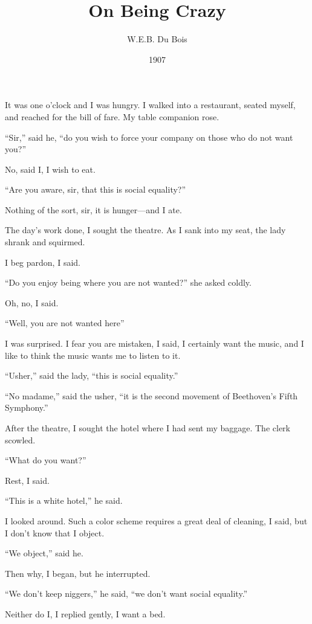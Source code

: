 \documentclass[10pt,a4paper]{article}
\begin{document}
\title{On Being Crazy}
\date{1907}
\author{W.E.B. Du Bois}



\maketitle
\noindent\linenumbers It was one o’clock and I was hungry. I walked into a restaurant, seated myself, and reached for the bill of fare. My table companion rose.

“Sir,” said he, “do you wish to force your company on those who do not want you?”

No, said I, I wish to eat.

“Are you aware, sir, that this is social equality?”

Nothing of the sort, sir, it is hunger—and I ate.

The day’s work done, I sought the theatre. As I sank into my seat, the lady shrank and squirmed.

I beg pardon, I said.

“Do you enjoy being where you are not wanted?” she asked coldly.

Oh, no, I said.

“Well, you are not wanted here”

I was surprised. I fear you are mistaken, I said, I certainly want the music, and I like to think the music wants me to listen to it.

“Usher,” said the lady, “this is social equality.”

“No madame,” said the usher, “it is the second movement of Beethoven’s Fifth Symphony.”

After the theatre, I sought the hotel where I had sent my baggage. The clerk scowled.

“What do you want?”

Rest, I said.

“This is a white hotel,” he said.

I looked around. Such a color scheme requires a great deal of cleaning, I said, but I don’t know that I object.

“We object,” said he.

Then why, I began, but he interrupted.

“We don’t keep niggers,” he said, “we don’t want social equality.”

Neither do I, I replied gently, I want a bed.
\end{document}
